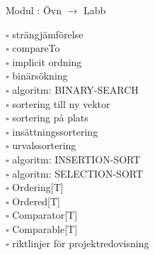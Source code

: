 
    Modul : Övn  $\rightarrow$ Labb \Alert{\texttt{--}}
    \begin{multicols}{3}\SlideFontTiny
    $\square$ strängjämförelse \\
$\square$ compareTo \\
$\square$ implicit ordning \\
$\square$ binärsökning \\
$\square$ algoritm: BINARY-SEARCH \\
$\square$ sortering till ny vektor \\
$\square$ sortering på plats \\
$\square$ insättningssortering \\
$\square$ urvalssortering \\
$\square$ algoritm: INSERTION-SORT \\
$\square$ algoritm: SELECTION-SORT \\
$\square$ Ordering[T] \\
$\square$ Ordered[T] \\
$\square$ Comparator[T] \\
$\square$ Comparable[T] \\
$\square$ riktlinjer för projektredovisning \\
    \end{multicols}
    
